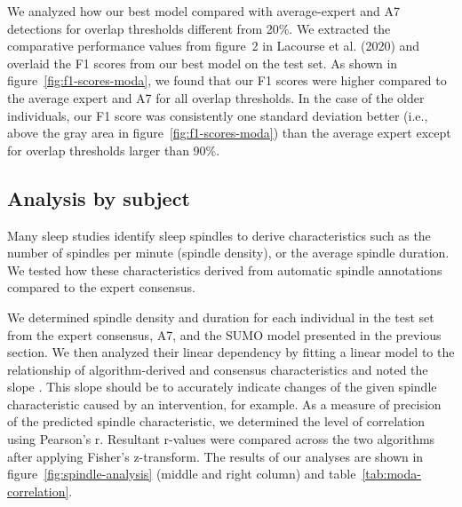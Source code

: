 \documentclass[fleqn,twocolumn,10pt]{wlscirep}
\begin{document}
We analyzed how our best model compared with average-expert and A7 detections
for overlap thresholds different from 20\%.  We extracted the comparative
performance values from figure~2 in Lacourse et al. (2020)\cite{Lacourse2020}
and overlaid the F1 scores from our best model on the test set.  As shown in
figure~\ref{fig:f1-scores-moda}, we found that our F1 scores were higher compared
to the average expert and A7 for all overlap thresholds.  In the case of the
older individuals, our F1 score was consistently one standard deviation better
(i.e., above the gray area in figure~\ref{fig:f1-scores-moda}) than the average
expert except for overlap thresholds larger than 90\%.

\subsection{Analysis by subject}

Many sleep studies identify sleep spindles to derive characteristics such as the
number of spindles per minute (spindle density), or the average spindle
duration.  We tested how these characteristics derived from automatic spindle
annotations compared to the expert consensus.

We determined spindle density and duration for each individual in the test set
from the expert consensus, A7, and the SUMO model presented
in the previous section.  We then analyzed their linear dependency by fitting a
linear model to the relationship of algorithm-derived and consensus
characteristics and noted the slope .  This slope should be  to accurately
indicate changes of the given spindle characteristic caused by an intervention,
for example.
As a measure of precision of the predicted spindle characteristic, we determined
the level of correlation using Pearson's r.  Resultant r-values were compared
across the two algorithms after applying Fisher's z-transform\cite{Fisher1921}.
The results of our analyses are shown in figure~\ref{fig:spindle-analysis} 
(middle and right column)
and table~\ref{tab:moda-correlation}.
\end{document}
